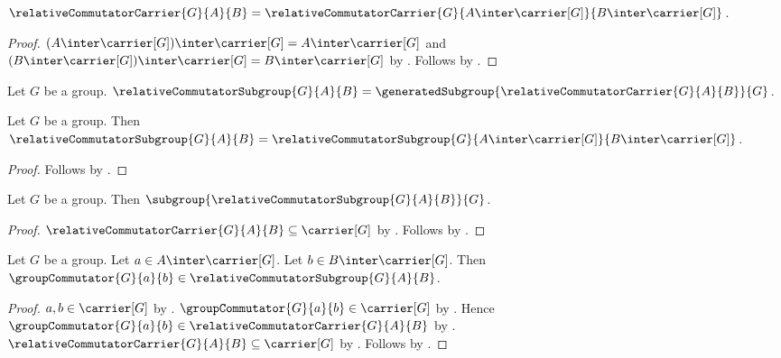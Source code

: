 \begin{proposition}\label{relative_commutator_carrier_trace}
    $\relativeCommutatorCarrier{G}{A}{B}=
        \relativeCommutatorCarrier{G}
            {A\inter\carrier[G]}{B\inter\carrier[G]}$.
\end{proposition}
\begin{proof}
    $(A\inter\carrier[G])\inter\carrier[G]
        =A\inter\carrier[G]$ and
        $(B\inter\carrier[G])\inter\carrier[G]
        =B\inter\carrier[G]$ by
        .
    Follows by .
\end{proof}

\begin{definition}\label{relative_commutator_subgroup}
    Let $G$ be a group.
    $\relativeCommutatorSubgroup{G}{A}{B}=
        \generatedSubgroup{
            \relativeCommutatorCarrier{G}{A}{B}}{G}$.
\end{definition}

\begin{proposition}\label{relative_commutator_subgroup_trace}
    Let $G$ be a group.
    Then
        $\relativeCommutatorSubgroup{G}{A}{B}=
            \relativeCommutatorSubgroup{G}
                {A\inter\carrier[G]}{B\inter\carrier[G]}$.
\end{proposition}
\begin{proof}
    Follows by
        .
\end{proof}

\begin{theorem}\label{relative_commutator_subgroup_is_subgroup}
    Let $G$ be a group.
    Then $\subgroup{\relativeCommutatorSubgroup{G}{A}{B}}{G}$.
\end{theorem}
\begin{proof}
    $\relativeCommutatorCarrier{G}{A}{B}\subseteq\carrier[G]$ by
        .
    Follows by
        .
\end{proof}

\begin{proposition}\label{relative_commutator_subgroup_contains_commutators}
    Let $G$ be a group.
    Let $a\in A\inter\carrier[G]$.
    Let $b\in B\inter\carrier[G]$.
    Then
        $\groupCommutator{G}{a}{b}\in
            \relativeCommutatorSubgroup{G}{A}{B}$.
\end{proposition}
\begin{proof}
    $a,b\in\carrier[G]$ by .
    $\groupCommutator{G}{a}{b}\in\carrier[G]$ by
        .
    Hence
        $\groupCommutator{G}{a}{b}\in
            \relativeCommutatorCarrier{G}{A}{B}$ by
        .
    $\relativeCommutatorCarrier{G}{A}{B}\subseteq\carrier[G]$ by
        .
    Follows by
        .
\end{proof}

